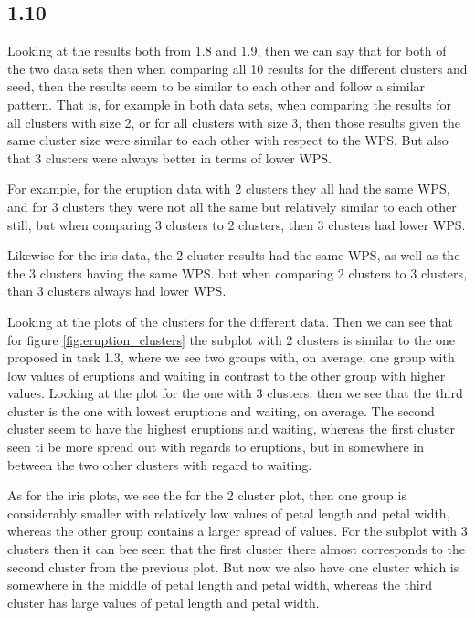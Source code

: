 \documentclass[10pt, a4paper, english]{article}\usepackage[]{graphicx}\usepackage[dvipsnames]{xcolor}
\begin{document}
\subsection{1.10}

Looking at the results both from 1.8 and 1.9, then we can say that for both of the two data sets then when comparing all 10 results for the different clusters and seed, then the results seem to be similar to each other and follow a similar pattern. That is, for example in both data sets, when comparing the results for all clusters with size 2, or for all clusters with size 3, then those results given the same cluster size were similar to each other with respect to the WPS. But also that 3 clusters were always better in terms of lower WPS.

For example, for the eruption data with 2 clusters they all had the same WPS, and for 3 clusters they were not all the same but relatively similar to each other still, but when comparing 3 clusters to 2 clusters, then 3 clusters had lower WPS. 

Likewise for the iris data, the 2 cluster results had the same WPS, as well as the the 3 clusters having the same WPS. but when comparing 2 clusters to 3 clusters, than 3 clusters always had lower WPS. 


Looking at the plots of the clusters for the different data. Then we can see that for figure \ref{fig:eruption_clusters} the subplot with 2 clusters is similar to the one proposed in task 1.3, where we see two groups with, on average, one group with low values of eruptions and waiting in contrast to the other group with higher values. Looking at the plot for the one with 3 clusters, then we see that the third cluster is the one with lowest eruptions and waiting, on average. The second cluster seem to have the highest eruptions and waiting, whereas the first cluster seen ti be more spread out with regards to eruptions, but in somewhere in between the two other clusters with regard to waiting. 

As for the iris plots, we see the for the 2 cluster plot,  then one group is considerably smaller with relatively low values of petal length and petal width, whereas the other group contains a larger spread of values.  For the subplot with 3 clusters then it can bee seen that the first cluster there almost corresponds to the second cluster from the previous plot. But now we also have one cluster which is somewhere in the middle of petal length and petal width, whereas the third cluster has large values of petal length and petal width. 
\end{document}
